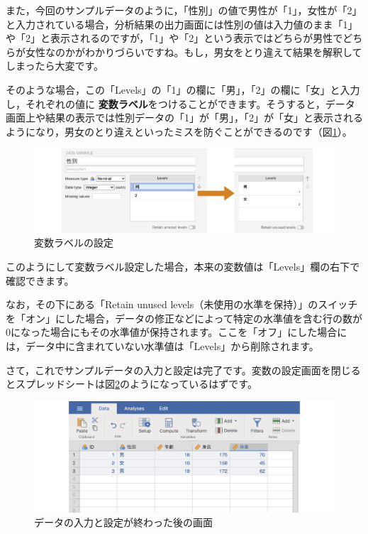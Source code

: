 \documentclass[
  12pt,
  a5jpaper,
  lualatex, ja=standard]{bxjsbook}
\renewcommand{\emph}[1]{\textbf{\color{emph} #1}}
\begin{document}
また，今回のサンプルデータのように，「性別」の値で男性が「1」，女性が「2」と入力されている場合，分析結果の出力画面には性別の値は入力値のまま「1」や「2」と表示されるのですが，「1」や「2」という表示ではどちらが男性でどちらが女性なのかがわかりづらいですね。もし，男女をとり違えて結果を解釈してしまったら大変です。

そのような場合，この「Levels」の「1」の欄に「男」，「2」の欄に「女」と入力し，それぞれの値に\emph{変数ラベル}をつけることができます。そうすると，データ画面上や結果の表示では性別データの「1」が「男」，「2」が「女」と表示されるようになり，男女のとり違えといったミスを防ぐことができるのです（図\ref{fig:data-variable-levels}）。

\begin{figure}[!ht]

{\centering \includegraphics[width=1\linewidth]{images/basics/data-variable-levels} 

}

\caption{変数ラベルの設定}\label{fig:data-variable-levels}
\end{figure}

このようにして変数ラベル設定した場合，本来の変数値は「Levels」欄の右下で確認できます。

なお，その下にある「Retain unused levels（未使用の水準を保持）」のスイッチを「オン」にした場合，データの修正などによって特定の水準値を含む行の数が0になった場合にもその水準値が保持されます。ここを「オフ」にした場合には，データ中に含まれていない水準値は「Levels」から削除されます。

\clearpage

さて，これでサンプルデータの入力と設定は完了です。変数の設定画面を閉じるとスプレッドシートは図\ref{fig:data-sample-data-complete}のようになっているはずです。

\begin{figure}[!ht]

{\centering \includegraphics[width=1\linewidth]{images/basics/data-sample-data-complete} 

}

\caption{データの入力と設定が終わった後の画面}\label{fig:data-sample-data-complete}
\end{figure}
\end{document}
